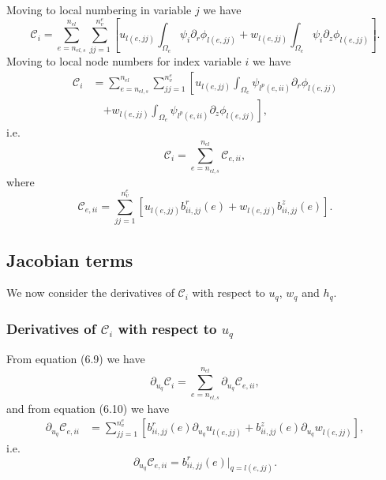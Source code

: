 \documentclass{article}
\begin{document}
Moving to local numbering in variable $j$ we have
\begin{equation}
\mathcal{C}_i = \sum_{e=n_{el,s}}^{n_{el}} \sum_{jj=1}^{n_v^e} \left[ u_{l(e,jj)} \int_{\Omega_e} \psi_i \partial_r \phi_{l(e,jj)} + w_{l(e,jj)} \int_{\Omega_e} \psi_i \partial_z \phi_{l(e,jj)} \right]. \tag{6.7}
\end{equation}
Moving to local node numbers for index variable $i$ we have
\begin{align}
\mathcal{C}_i &= \sum_{e=n_{el,s}}^{n_{el}} \sum_{jj=1}^{n_v^e} \left[ u_{l(e,jj)} \int_{\Omega_e} \psi_{l^p(e,ii)} \partial_r \phi_{l(e,jj)} \right. \nonumber\\
&\quad \left. + w_{l(e,jj)} \int_{\Omega_e} \psi_{l^p(e,ii)} \partial_z \phi_{l(e,jj)} \right], \tag{6.8}
\end{align}
i.e.
\begin{equation}
\mathcal{C}_i = \sum_{e=n_{el,s}}^{n_{el}} \mathcal{C}_{e,ii}, \tag{6.9}
\end{equation}
where
\begin{equation}
\mathcal{C}_{e,ii} = \sum_{jj=1}^{n_v^e} \left[ u_{l(e,jj)} b_{ii,jj}^r(e) + w_{l(e,jj)} b_{ii,jj}^z(e) \right]. \tag{6.10}
\end{equation}

\subsection{Jacobian terms} %
We now consider the derivatives of $\mathcal{C}_i$ with respect to $u_q$, $w_q$ and $h_q$.

\subsubsection{Derivatives of $\mathcal{C}_i$ with respect to $u_q$} %
From equation (6.9) we have
\begin{equation}
\partial_{u_q} \mathcal{C}_i = \sum_{e=n_{el,s}}^{n_{el}} \partial_{u_q} \mathcal{C}_{e,ii}, \tag{6.11}
\end{equation}
and from equation (6.10) we have
\begin{align}
\partial_{u_q} \mathcal{C}_{e,ii} &= \sum_{jj=1}^{n_v^e} \left[ b_{ii,jj}^r(e) \partial_{u_q} u_{l(e,jj)} + b_{ii,jj}^z(e) \partial_{u_q} w_{l(e,jj)} \right], \tag{6.12}
\end{align}
i.e.
\begin{equation}
\partial_{u_q} \mathcal{C}_{e,ii} = b_{ii,jj}^r(e) \big|_{q=l(e,jj)}. \tag{6.13}
\end{equation}
\end{document}
